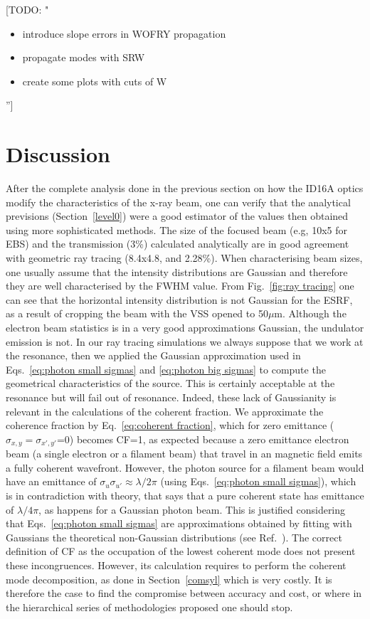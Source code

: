 \documentclass{iucr}              %
\newcommand{\todo}[1]{{\color{red}[TODO: "#1'']}}
\begin{document}
\todo{
\begin{itemize}
 \item introduce slope errors in WOFRY propagation
 \item propagate modes with SRW
 \item create some plots with cuts of W
\end{itemize}
}
 

\section{Discussion} 
\label{discussion}

After the complete analysis done in the previous section on how the ID16A optics modify the characteristics of the x-ray beam, one can verify that the analytical previsions (Section~\ref{level0}) were a good estimator of the values then obtained using more sophisticated methods. The size of the focused beam (e.g, 10x5 for EBS) and the transmission (3\%) calculated analytically are in good agreement with geometric ray tracing (8.4x4.8, and 2.28\%). When characterising beam sizes, one usually assume that the intensity distributions are Gaussian and therefore they are well characterised by the FWHM value. From Fig.~\ref{fig:ray tracing} one can see that the horizontal intensity distribution is not Gaussian for the ESRF, as a result of cropping the beam with the VSS opened to 50$\mu$m. Although the electron beam statistics is in a very good approximations Gaussian, the undulator emission is not. In our ray tracing simulations we always suppose that we work at the resonance, then we applied the Gaussian approximation used in Eqs.~\ref{eq:photon small sigmas} and \ref{eq:photon big sigmas} to compute the geometrical characteristics of the source. This is certainly acceptable at the resonance but will fail out of resonance. Indeed, these lack of Gaussianity is relevant in the calculations of the coherent fraction. We approximate the coherence fraction by Eq.~\ref{eq:coherent fraction}, which for zero emittance ($\sigma_{x,y}=\sigma_{x',y'}$=0) becomes CF=1, as expected because a zero emittance electron beam (a single electron or a filament beam) that travel in an magnetic field emits a fully coherent wavefront. However, the photon source for a filament beam would have an emittance of $\sigma_u \sigma_{u'} \approx \lambda / 2 \pi$ (using Eqs.~\ref{eq:photon small sigmas}), which is in contradiction with theory, that says that a pure coherent state has emittance of $\lambda / 4 \pi$, as happens for a Gaussian photon beam. This is justified considering that Eqs.~\ref{eq:photon small sigmas} are approximations obtained by fitting with Gaussians the theoretical non-Gaussian distributions (see Ref.~\cite{elleaume}). The correct definition of CF as the occupation of the lowest coherent mode does not present these incongruences. However, its calculation requires to perform the coherent mode decomposition, as done in Section~\ref{comsyl} which is very costly. It is therefore the case to find the compromise between accuracy and cost, or where in the hierarchical series of methodologies proposed one should stop. 
\end{document}
